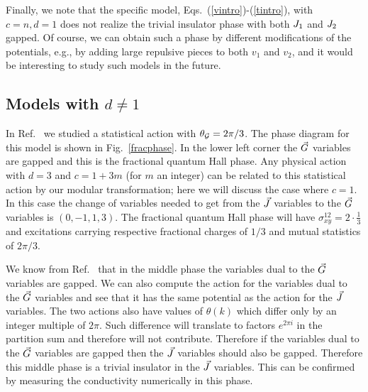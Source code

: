 Finally, we note that the specific model, Eqs.~(\ref{vintro})-(\ref{tintro}), with $c=n, d=1$ does not realize the trivial insulator phase with both $J_1$ and $J_2$ gapped.  Of course, we can obtain such a phase by different modifications of the potentials, e.g., by adding large repulsive pieces to both $v_1$ and $v_2$, and it would be interesting to study such models in the future.


\subsection{Models with $d\neq 1$}
In Ref.~\cite{short_range3} we studied a statistical action with $\theta_{\cal{G}} = 2\pi/3$. The phase diagram for this model is shown in Fig.~\ref{fracphase}. In the lower left corner the $\vec{G}$ variables are gapped and this is the fractional quantum Hall phase. Any physical action with $d=3$ and $c=1+3m$ (for $m$ an integer) can be related to this statistical action by our modular transformation; here we will discuss the case where $c=1$. In this case the change of variables needed to get from the $\vec{J}$ variables to the $\vec{G}$ variables is $(0, -1, 1, 3)$. The fractional quantum Hall phase will have $\sigma^{12}_{xy}=2\cdot\frac{1}{3}$ and excitations carrying respective fractional charges of $1/3$ and mutual statistics of $2\pi/3$.

We know from Ref.~\cite{short_range3} that in the middle phase the variables dual to the $\vec{G}$ variables are gapped. 
We can also compute the action for the variables dual to the $\vec{G}$ variables and see that it has the same potential as the action for the $\vec{J}$ variables. The two actions also have values of $\theta(k)$ which differ only by an integer multiple of $2\pi$. Such difference will translate to factors $e^{2\pi i}$ in the partition sum and therefore will not contribute. Therefore if the variables dual to the $\vec{G}$ variables are gapped then the $\vec{J}$ variables should also be gapped. Therefore this middle phase is a trivial insulator in the $\vec{J}$ variables. This can be confirmed by measuring the conductivity numerically in this phase. 

